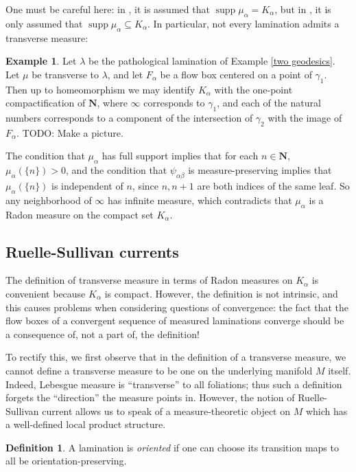 \documentclass[reqno,10pt]{amsart}
\newcommand{\NN}{\mathbf{N}}
\DeclareMathOperator{\supp}{supp}
\newcommand{\dfn}[1]{\emph{#1}\index{#1}}
\theoremstyle{definition}
\newtheorem{definition}[theorem]{Definition}
\newtheorem{example}[theorem]{Example}
\numberwithin{equation}{section}
\begin{document}
One must be careful here: in \cite{thurston1979geometry}, it is assumed that $\supp \mu_\alpha = K_\alpha$, but in \cite{daskalopoulos2020transverse}, it is only assumed that $\supp \mu_\alpha \subseteq K_\alpha$.
In particular, not every lamination admits a transverse measure:

\begin{example}
Let $\lambda$ be the pathological lamination of Example \ref{two geodesics}.
Let $\mu$ be transverse to $\lambda$, and let $F_\alpha$ be a flow box centered on a point of $\gamma_1$.
Then up to homeomorphism we may identify $K_\alpha$ with the one-point compactification of $\NN$, where $\infty$ corresponds to $\gamma_1$, and each of the natural numbers corresponds to a component of the intersection of $\gamma_2$ with the image of $F_\alpha$.
TODO: Make a picture.

The condition that $\mu_\alpha$ has full support implies that for each $n \in \NN$, $\mu_\alpha(\{n\}) > 0$, and the condition that $\psi_{\alpha \beta}$ is measure-preserving implies that $\mu_\alpha(\{n\})$ is independent of $n$, since $n, n + 1$ are both indices of the same leaf.
So any neighborhood of $\infty$ has infinite measure, which contradicts that $\mu_\alpha$ is a Radon measure on the compact set $K_\alpha$.
\end{example}


\subsection{Ruelle-Sullivan currents}
The definition of transverse measure in terms of Radon measures on $K_\alpha$ is convenient because $K_\alpha$ is compact.
However, the definition is not intrinsic, and this causes problems when considering questions of convergence: the fact that the flow boxes of a convergent sequence of measured laminations converge should be a consequence of, not a part of, the definition!

To rectify this, we first observe that in the definition of a transverse measure, we cannot define a transverse measure to be one on the underlying manifold $M$ itself.
Indeed, Lebesgue measure is ``transverse'' to all foliations; thus such a definition forgets the ``direction'' the measure points in.
However, the notion of Ruelle-Sullivan current allows us to speak of a measure-theoretic object on $M$ which has a well-defined local product structure.

\begin{definition}
A lamination is \dfn{oriented} if one can choose its transition maps to all be orientation-preserving.
\end{definition}
\end{document}
